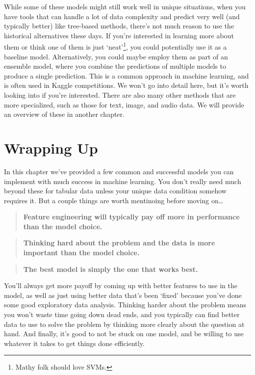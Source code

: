 \documentclass[
  letterpaper,
]{krantz}
\begin{document}
While some of these models might still work well in unique situations,
when you have tools that can handle a lot of data complexity and predict
very well (and typically better) like tree-based methods, there's not
much reason to use the historical alternatives these days. If you're
interested in learning more about them or think one of them is just
`neat'\footnote{Mathy folk should love SVMs.}, you could potentially use
it as a baseline model. Alternatively, you could maybe employ them as
part of an ensemble model, where you combine the predictions of multiple
models to produce a single prediction. This is a common approach in
machine learning, and is often used in Kaggle competitions. We won't go
into detail here, but it's worth looking into if you're interested.
There are also many other methods that are more specialized, such as
those for text, image, and audio data. We will provide an overview of
these in another chapter.

\section{Wrapping Up}\label{wrapping-up-1}

In this chapter we've provided a few common and successful models you
can implement with much success in machine learning. You don't really
need much beyond these for tabular data unless your unique data
condition somehow requires it. But a couple things are worth mentinoing
before moving on\ldots{}

\begin{quote}
\textbf{Feature engineering will typically pay off more in performance
than the model choice.}
\end{quote}

\begin{quote}
\textbf{Thinking hard about the problem and the data is more important
than the model choice.}
\end{quote}

\begin{quote}
\textbf{The best model is simply the one that works best.}
\end{quote}

You'll always get more payoff by coming up with better features to use
in the model, as well as just using better data that's been `fixed'
because you've done some good exploratory data analysis. Thinking harder
about the problem means you won't waste time going down dead ends, and
you typically can find better data to use to solve the problem by
thinking more clearly about the question at hand. And finally, it's good
to not be stuck on one model, and be willing to use whatever it takes to
get things done efficiently.
\end{document}
